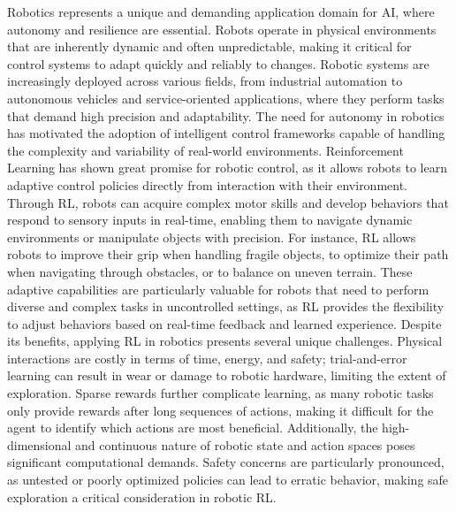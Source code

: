 Robotics represents a unique and demanding application domain for AI, where autonomy and resilience are essential.
Robots operate in physical environments that are inherently dynamic and often unpredictable, making it critical for
control systems to adapt quickly and reliably to changes.
Robotic systems are increasingly deployed across various fields, from industrial automation to autonomous vehicles and
service-oriented applications, where they perform tasks that demand high precision and adaptability.
The need for autonomy in robotics has motivated the adoption of intelligent control frameworks capable of handling the
complexity and variability of real-world environments.
Reinforcement Learning has shown great promise for robotic control, as it allows robots to learn adaptive control
policies directly from interaction with their environment.
Through RL, robots can acquire complex motor skills and develop behaviors that respond to sensory inputs in real-time,
enabling them to navigate dynamic environments or manipulate objects with precision.
For instance, RL allows robots to improve their grip when handling fragile objects, to optimize their path when
navigating through obstacles, or to balance on uneven terrain.
These adaptive capabilities are particularly valuable for robots that need to perform diverse and complex tasks in
uncontrolled settings, as RL provides the flexibility to adjust behaviors based on real-time feedback and learned
experience.
Despite its benefits, applying RL in robotics presents several unique challenges.
Physical interactions are costly in terms of time, energy, and safety; trial-and-error learning can result in wear or
damage to robotic hardware, limiting the extent of exploration.
Sparse rewards further complicate learning, as many robotic tasks only provide rewards after long sequences of actions,
making it difficult for the agent to identify which actions are most beneficial.
Additionally, the high-dimensional and continuous nature of robotic state and action spaces poses significant
computational demands.
Safety concerns are particularly pronounced, as untested or poorly optimized policies can lead to erratic behavior,
making safe exploration a critical consideration in robotic RL.

